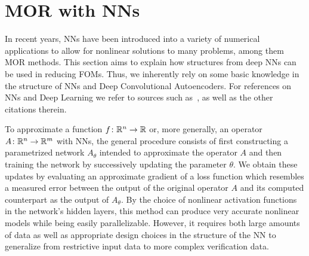 \section{MOR with \aclp{NN}}\label{sec:nn-mor}

In recent years, \acp{NN} have been introduced into a variety of numerical applications to allow for nonlinear solutions to many problems, among them \ac{MOR} methods.
This section aims to explain how structures from deep \acp{NN} can be used in reducing \acp{FOM}.
Thus, we inherently rely on some basic knowledge in the structure of \acp{NN} and Deep Convolutional Autoencoders.
For references on \acp{NN} and Deep Learning we refer to sources such as~\cite{Goodfellow2016, Kubat2017, Sarker2021}, as well as the other citations therein.

To approximate a function $f \colon \mathbb{R}^n \to \mathbb{R}$ or, more generally, an operator $A \colon \mathbb{R}^n \to \mathbb{R}^m$ with \acp{NN}, the general procedure consists of first constructing a parametrized network $A_\theta$ intended to approximate the operator $A$ and then training the network by successively updating the parameter $\theta$.
We obtain these updates by evaluating an approximate gradient of a loss function which resembles a measured error between the output of the original operator $A$ and its computed counterpart as the output of $A_\theta$.
By the choice of nonlinear activation functions in the network's hidden layers, this method can produce very accurate nonlinear models while being easily parallelizable.
However, it requires both large amounts of data as well as appropriate design choices in the structure of the \ac{NN} to generalize from restrictive input data to more complex verification data.

